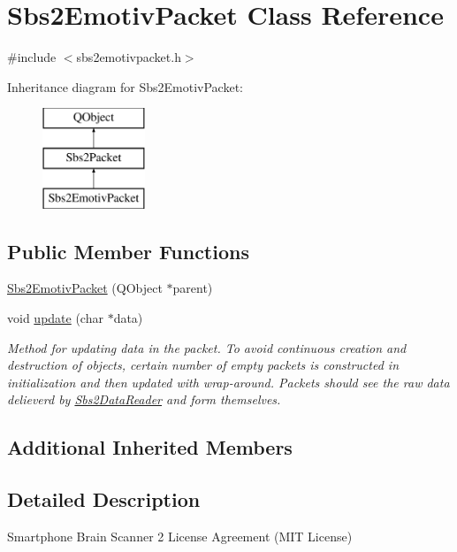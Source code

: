 \hypertarget{classSbs2EmotivPacket}{\section{Sbs2\-Emotiv\-Packet Class Reference}
\label{classSbs2EmotivPacket}
}


{\ttfamily \#include $<$sbs2emotivpacket.\-h$>$}

Inheritance diagram for Sbs2\-Emotiv\-Packet\-:\begin{figure}[H]
\begin{center}
\leavevmode
\includegraphics[height=3.000000cm]{classSbs2EmotivPacket}
\end{center}
\end{figure}
\subsection*{Public Member Functions}
\begin{DoxyCompactItemize}
\item 
\hyperlink{classSbs2EmotivPacket_a05de077593ed85a082584fb212221388}{Sbs2\-Emotiv\-Packet} (Q\-Object $\ast$parent)
\item 
void \hyperlink{classSbs2EmotivPacket_aaf8b25e8f747bbb80d7dcc5853d6e814}{update} (char $\ast$data)
\begin{DoxyCompactList}\small\item\em Method for updating data in the packet. To avoid continuous creation and destruction of objects, certain number of empty packets is constructed in initialization and then updated with wrap-\/around. Packets should see the raw data delieverd by \hyperlink{classSbs2DataReader}{Sbs2\-Data\-Reader} and form themselves. \end{DoxyCompactList}\end{DoxyCompactItemize}
\subsection*{Additional Inherited Members}


\subsection{Detailed Description}
Smartphone Brain Scanner 2 License Agreement (M\-I\-T License)


